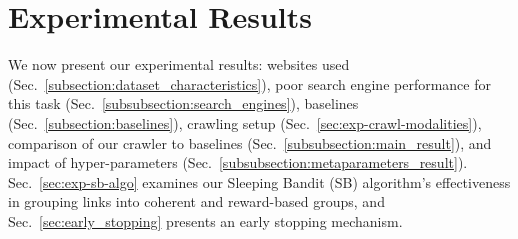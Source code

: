\section{Experimental Results}\label{sec:results}

We now present our experimental results: websites used (Sec.~\ref{subsection:dataset_characteristics}), poor search engine performance for this task (Sec.~\ref{subsubsection:search_engines}), baselines (Sec.~\ref{subsection:baselines}), crawling setup (Sec.~\ref{sec:exp-crawl-modalities}),
comparison of our crawler to baselines (Sec.~\ref{subsubsection:main_result}), and impact of hyper-parameters (Sec.~\ref{subsubsection:metaparameters_result}). Sec.~\ref{sec:exp-sb-algo} examines our Sleeping Bandit (SB) algorithm's effectiveness in grouping links into coherent and reward-based groups, and Sec.~\ref{sec:early_stopping} presents an early stopping mechanism.







